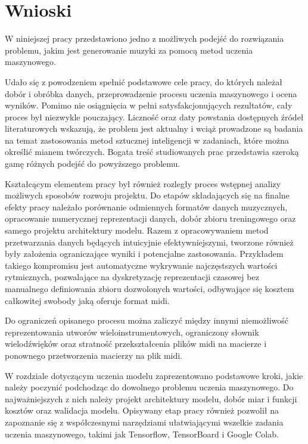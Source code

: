 \chapter{Wnioski}
{
    W\,\,niniejszej pracy przedstawiono jedno z\,\,możliwych podejść do rozwiązania problemu,
    jakim jest generowanie muzyki za pomocą metod uczenia maszynowego. 

    Udało się z powodzeniem spełnić podstawowe cele pracy, do których należał dobór i obróbka danych, 
    przeprowadzenie procesu uczenia maszynowego i ocena wyników. Pomimo nie osiągnięcia w\,\,pełni satysfakcjonujących rezultatów, cały proces był niezwykle pouczający. 
    Liczność oraz daty powstania dostępnych źródeł literaturowych wskazują, że problem jest aktualny 
    i\,\,wciąż prowadzone są badania na temat zastosowania metod sztucznej inteligencji w\,\,zadaniach, 
    które można określić mianem twórczych. Bogata treść studiowanych prac przedstawia szeroką gamę 
    różnych podejść do powyższego problemu.

    Kształcącym elementem pracy był również rozległy proces wstępnej analizy możliwych sposobów
    rozwoju projektu. Do etapów składających się na finalne efekty pracy należało porównanie odmiennych 
    formatów danych muzycznych, opracowanie numerycznej reprezentacji danych, dobór zbioru treningowego
    oraz samego projektu architektury modelu. 
    Razem z\,\,opracowywaniem metod przetwarzania danych będących intuicyjnie efektywniejszymi, tworzone również były założenia
    ograniczające wyniki i\,\,potencjalne zastosowania. Przykładem takiego kompromisu jest automatyczne wykrywanie
    najczęstszych wartości rytmicznych, pozwalające na dyskretyzację reprezentacji czasowej bez
    manualnego definiowania zbioru dozwolonych wartości, odbywające się kosztem całkowitej swobody jaką oferuje format midi.
    
    Do ograniczeń opisanego procesu można zaliczyć między innymi niemożliwość reprezentowania utworów wieloinstrumentowych, 
    ograniczony słownik wielodźwięków oraz stratność przekształcenia plików midi na macierze i\,\,ponownego przetworzenia
    macierzy na plik midi.

    W\,\,rozdziale dotyczącym uczenia modelu zaprezentowano podstawowe kroki, jakie należy poczynić podchodząc do
    dowolnego problemu uczenia maszynowego. Do najważniejszych z\,\,nich należy projekt architektury modelu,
    dobór miar i\,\,funkcji kosztów oraz walidacja modelu. Opisywany etap pracy również pozwolił na zapoznanie 
    się z\,\,współczesnymi narzędziami ułatwiającymi wszelkie zadania uczenia maszynowego, takimi jak Tensorflow, 
    TensorBoard i\,\,Google Colab. 

}
